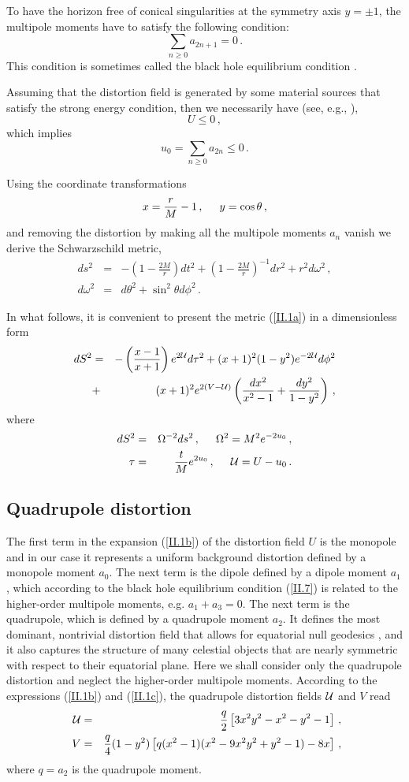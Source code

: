 \documentclass[twocolumn,showpacs,preprintnumbers,amsmath,amssymb,floatfix,nofootinbib]{revtex4-1}
\newcommand{\be}{\begin{equation}}
\newcommand{\ee}{\end{equation}}
\newcommand{\ba}{\begin{eqnarray}}
\newcommand{\ea}{\end{eqnarray}}
\newcommand{\non}{\nonumber}
\newcommand{\eq}[1]{(\ref{#1})}
\newcommand{\n}[1]{\label{#1}}
\newcommand{\hhh}{\, ,\hspace{0.5cm}}
\newcommand{\cu}{{\cal U}}
\begin{document}
To have the horizon free of conical singularities at the symmetry axis $y=\pm1$, the multipole moments have to satisfy the following condition:
\be\n{II.7}
\sum_{n\geq0}a_{2n+1}=0\,.
\ee
This condition is sometimes called the black hole equilibrium condition \cite{Chandrasekhar}.

Assuming that the distortion field is generated by some material sources that satisfy the strong energy condition, then we necessarily have (see, e.g., \cite{Geroch:1982bv,Fairhurst:2000xh}), 
\be\n{II.8a}
U\leq0\,,
\ee
which implies 
\be\n{II.8b}
u_{0}=\sum_{n\geq0}a_{2n}\leq0\,.
\ee
 
Using the coordinate transformations 
\be\n{II.9}
x=\frac{r}{M}-1\hhh y=\cos\theta\,,
\ee
and removing the distortion by making all the multipole moments $a_{n}$ vanish we derive the Schwarzschild metric,
\ba\n{II.10}
ds^2&=&-\left(1-\frac{2M}{r}\right)dt^2+\left(1-\frac{2M}{r}\right)^{-1}dr^2+r^{2}d\omega^{2}\,,\non\\
d\omega^{2}&=&d\theta^2+\sin^2\theta d\phi^2\,.
\ea

In what follows, it is convenient to present the metric \eq{II.1a} in a dimensionless form
\ba\n{II.5}
dS^{2}&=&-\left(\frac{x-1}{x+1}\right)e^{2\cu}d\tau^{2}+(x+1)^{2}(1-y^{2})e^{-2\cu}d\phi^{2}\non\\
&+&(x+1)^{2}e^{2(V-\cu)}\left(\frac{dx^{2}}{x^{2}-1}+\frac{dy^{2}}{1-y^{2}}\right)\,,
\ea
where
\ba\n{II.6}
dS^{2}&=&\Omega^{-2}ds^{2}\hhh\Omega^{2}=M^{2}e^{-2u_{0}}\,,\non\\
\tau&=&\frac{t}{M}e^{2u_{0}}\hhh \cu=U-u_{0}\,.
\ea

\subsection{Quadrupole distortion}

The first term in the expansion \eq{II.1b} of the distortion field $U$ is the monopole and in our case it represents a uniform background distortion defined by a monopole moment $a_{0}$. The next term is the dipole defined by a dipole moment $a_{1}$, which according to the black hole equilibrium condition \eq{II.7} is related to the higher-order multipole moments, e.g. $a_1+a_3=0$.  The next term is the quadrupole, which is defined by a quadrupole moment $a_{2}$. It defines the most dominant, nontrivial distortion field that allows for equatorial null geodesics \cite{Shoom:2015slu}, and it also captures the structure of many celestial objects that are nearly symmetric with respect to their equatorial plane. Here we shall consider only the quadrupole distortion and neglect the higher-order multipole moments. According to the expressions \eq{II.1b} and \eq{II.1c}, the quadrupole distortion fields $\cu$ and $V$ read
\ba
\cu&=&\frac{q}{2}\left[3x^2y^2-x^2-y^2-1\right]\,,\n{III.1a}\\\
V&=&\frac{q}{4}(1-y^2)\left[q(x^2-1)(x^2-9x^2y^2+y^2-1)-8x\right]\,,\non\\
\n{III.1b}
\ea
where $q=a_{2}$ is the quadrupole moment. 
\end{document}
